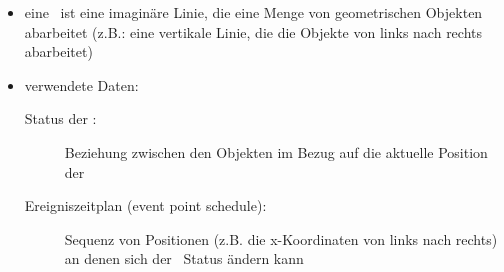 \vspace*{0.25\baselineskip}
\begin{itemize}
	\item eine \sweep~ist eine imaginäre Linie, die eine Menge von geometrischen Objekten abarbeitet (z.B.: eine vertikale Linie, die die Objekte von links nach rechts abarbeitet)
	\item verwendete Daten:
		\begin{description}
			\item[Status der \sweep:] Beziehung zwischen den Objekten im Bezug auf die aktuelle Position der \sweep
			\item[Ereigniszeitplan (event point schedule):] Sequenz von Positionen (z.B. die x-Koordinaten von links nach rechts) an denen sich der \sweep~Status ändern kann
		\end{description}
\end{itemize}



